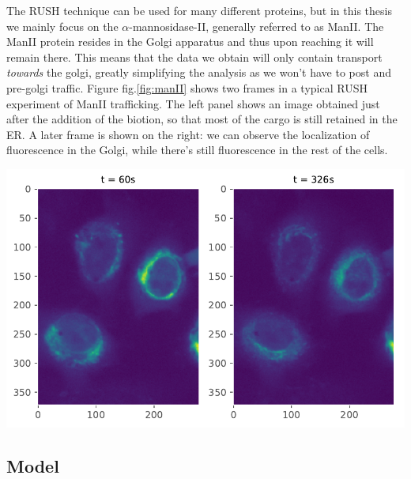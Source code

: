 \documentclass[12pt,a4paper,]{Dissertate}
\let\origfigure\figure
\let\endorigfigure\endfigure
\renewenvironment{figure}[1][2] {
    \expandafter\origfigure\expandafter[H]
} {
    \endorigfigure
}
\begin{document}
The RUSH technique can be used for many different proteins, but in this
thesis we mainly focus on the \(\alpha\)-mannosidase-II, generally
referred to as ManII. The ManII protein resides in the Golgi apparatus
and thus upon reaching it will remain there. This means that the data we
obtain will only contain transport \emph{towards} the golgi, greatly
simplifying the analysis as we won't have to post and pre-golgi traffic.
Figure fig.\ref{fig:manII} shows two frames in a typical RUSH
experiment of ManII trafficking. The left panel shows an image obtained
just after the addition of the biotion, so that most of the cargo is
still retained in the ER. A later frame is shown on the right: we can
observe the localization of fluorescence in the Golgi, while there's
still fluorescence in the rest of the cells.

\begin{figure}
\hypertarget{fig:manII}{%
\centering
\includegraphics{source/figures/pdf/frames.pdf}
\caption{Two frames of the ManII transport images using the RUSH
technique.}\label{fig:manII}
}
\end{figure}

\hypertarget{model}{%
\subsection{Model}\label{model}}
\end{document}
